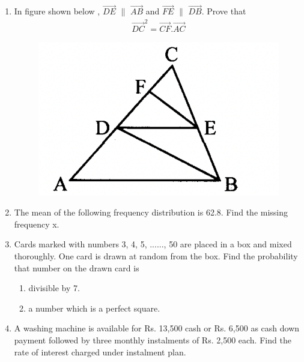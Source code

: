 \documentclass[journal,12pt,twocolumn]{IEEEtran}
\begin{document}
\begin{enumerate}
\item In figure shown below , $\vec{DE} $ $\|$ $\vec{AB} $ and $\vec{FE} $ $\|$ $\vec{DB} $. Prove that 
\begin{align}
\vec{DC}^2=\vec{CF}.\vec{AC} \nonumber
\end{align}
\begin{figure}[H]
    \centering
    \includegraphics[width=\columnwidth]{4.png}
    \caption{}
 \end{figure}
 \item The mean of the following frequency distribution is 62.8. Find the missing frequency x.
 \begin{table}[htb]
 \centering
 \caption{}
 \end{table}
 
\item Cards marked with numbers 3, 4, 5, ......, 50 are placed in a box and mixed thoroughly. One card is drawn at random from the box. Find the probability that number on the drawn card is
\begin{enumerate}
\item divisible by 7.
\item a number which is a perfect square.
\end{enumerate}
 
\item A washing machine is available for Rs. 13,500 cash or Rs. 6,500 as cash down payment followed by three monthly instalments of Rs. 2,500 each. Find the rate of interest charged under instalment plan.
\bigskip

\end{enumerate}
\end{document}

